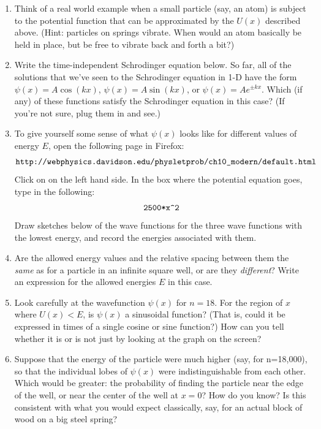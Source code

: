 \begin{enumerate}[wide]
\item Think of a real world example when a small particle (say, an atom) is subject to the potential function that can be approximated by the $U(x)$ described above.  (Hint: particles on springs vibrate.  When would an atom basically be held in place, but be free to vibrate back and forth a bit?)
\answerspace{0.6in}

\item Write the time-independent Schrodinger equation below.  So far, all of the solutions that we've seen to the Schrodinger equation in 1-D have the form $\psi(x) = A\cos(kx)$, $\psi(x) = A\sin(kx)$, or $\psi(x) = Ae^{\pm kx}$.  Which (if any) of these functions satisfy the Schrodinger equation in this case?  (If you're not sure, plug them in and see.) 
\answerspace{1.6in}

\item To give yourself some sense of what $\psi(x)$ looks like for different values of energy $E$, open the following page in Firefox:
$$\verb!http://webphysics.davidson.edu/physletprob/ch10_modern/default.html!$$
Click on  on the left hand side.  In the box where the potential equation goes, type in the following: $$\verb!2500*x^2!$$
Draw sketches below of the wave functions for the three wave functions with the lowest energy, and record the energies associated with them.  
\answerspace{1.6in}

\item Are the allowed energy values and the relative spacing between them the \textit{same} as for a particle in an infinite square well, or are they \textit{different}?  Write an expression for the allowed energies $E$ in this case.
\answerspace{1.0in}

\item Look carefully at the wavefunction $\psi(x)$ for $n=18$.  For the region of $x$ where $U(x)<E$, is $\psi(x)$ a sinusoidal function?  (That is, could it be expressed in times of a single cosine or sine function?)  How can you tell whether it is or is not just by looking at the graph on the screen?  
\answerspace{1.0in}

\item Suppose that the energy of the particle were much higher (say, for n=18,000), so that the individual lobes of $\psi(x)$ were indistinguishable from each other.  Which would be greater: the probability of finding the particle near the edge of the well, or near the center of the well at $x = 0$?  How do you know?  Is this consistent with what you would expect classically, say, for an actual block of wood on a big steel spring?
\answerspace{0.8in}
\end{enumerate}
